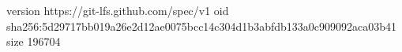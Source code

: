 version https://git-lfs.github.com/spec/v1
oid sha256:5d29717bb019a26e2d12ae0075bcc14c304d1b3abfdb133a0c909092aca03b41
size 196704
